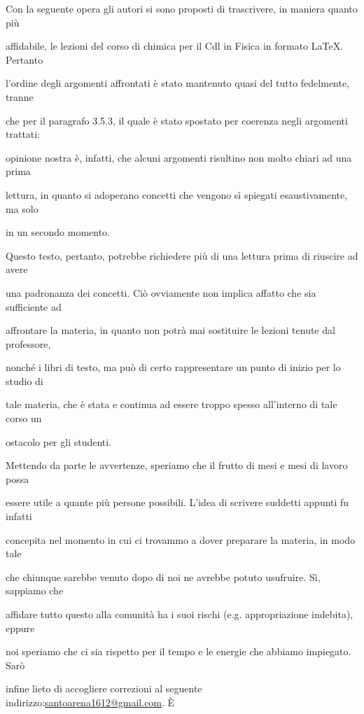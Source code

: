 \documentclass[12pt]{book}%
\newcommand{\E}{È \hspace{0.1mm}}
\begin{document}
Con la seguente opera gli autori si sono proposti di trascrivere, in maniera quanto più

affidabile, le lezioni del corso di chimica per il Cdl in Fisica in formato \LaTeX. Pertanto

l'ordine degli argomenti affrontati è stato mantenuto quasi del tutto fedelmente, tranne

che per il paragrafo 3.5.3, il quale è stato spostato per coerenza negli argomenti trattati:

opinione nostra è, infatti, che alcuni argomenti risultino non molto chiari ad una prima

lettura, in quanto si adoperano concetti che vengono sì spiegati esaustivamente, ma solo

in un secondo momento.

\vspace{0.2cm}
Questo testo, pertanto, potrebbe richiedere più di una lettura prima di riuscire ad avere

una padronanza dei concetti. Ciò ovviamente non implica affatto che sia sufficiente ad

affrontare la materia, in quanto non potrà mai sostituire le lezioni tenute dal professore,

nonché i libri di testo, ma può di certo rappresentare un punto di inizio per lo studio di

tale materia, che è stata e continua ad essere troppo spesso all'interno di tale corso un

ostacolo per gli studenti.

\vspace{0.2cm}
Mettendo da parte le avvertenze, speriamo che il frutto di mesi e mesi di lavoro possa

essere utile a quante più persone possibili. L'idea di scrivere suddetti appunti fu infatti

concepita nel momento in cui ci trovammo a dover preparare la materia, in modo tale

che chiunque sarebbe venuto dopo di noi ne avrebbe potuto usufruire. Sì, sappiamo che

affidare tutto questo alla comunità ha i suoi rischi (e.g. appropriazione indebita), eppure

noi speriamo che ci sia rispetto per il tempo e le energie che abbiamo impiegato. Sarò

infine lieto di accogliere correzioni al seguente indirizzo:\hspace{0.15cm}\href{mailto:santoarena1612@gmail.com}{santoarena1612@gmail.com}. \E
\end{document}
